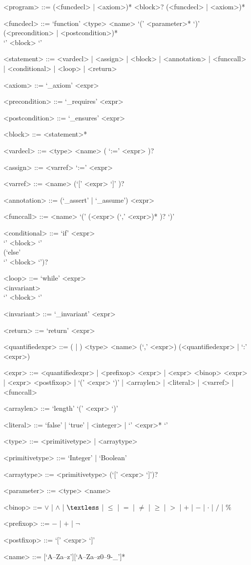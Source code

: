 \setlength{\grammarindent}{12em} %

\begin{grammar}

<program> ::= (<funcdecl> | <axiom>)* <block>? (<funcdecl> | <axiom>)*

<funcdecl> ::= `function' <type> <name> `(' <parameter>* `)' \\ (<precondition> | <postcondition>)* \\ `{' <block> `}'

<statement> ::= <vardecl> | <assign> | <block> | <annotation> | <funccall> | <conditional> | <loop> | <return>

<axiom> ::= `_axiom' <expr>

<precondition> ::= `_requires' <expr>

<postcondition> ::= `_ensures' <expr>

<block> ::= <statement>*

<vardecl> ::= <type> <name> ( `:=' <expr> )?

<assign> ::= <varref> `:=' <expr>

<varref> ::= <name> (`[' <expr> `]' )?

<annotation> ::= (`_assert' | `_assume') <expr>

<funccall> ::= <name> `(' (<expr> (`,' <expr>)* )? `)'

<conditional> ::= `if' <expr> \\ `{' <block> `}'  \\ (`else' \\ `{' <block> `}')?

<loop> ::= `while' <expr> \\ <invariant> \\ `{' <block> `}'

<invariant> ::= `_invariant' <expr>

<return> ::= `return' <expr>

<quantifiedexpr> ::= (\lit{$\forall$} | \lit{$\exists$} ) <type> <name> (`,' <expr>) (<quantifiedexpr> | `:' <expr>)

<expr> ::= <quantifiedexpr> | <prefixop> <expr> | <expr> <binop> <expr> | <expr> <postfixop> | `(' <expr> `)' | <arraylen> | <literal> | <varref> | <funccall>

<arraylen> ::= `length' `(' <expr> `)'

<literal> ::= `false' | `true' | <integer> | `{' <expr>* `}'

<type> ::= <primitivetype> | <arraytype>

<primitivetype> ::= `Integer' | `Boolean'

<arraytype> ::= <primitivetype> (`[' <expr> `]')?

<parameter> ::= <type> <name>

<binop> ::= $\vee$ | $\wedge$ | $\textless$ | $\leq$ | $=$ | $\neq$ | $\geq$ | $>$ | $+$ | $-$ | $\cdot$ | $/$ | $\%$

<prefixop> ::= $-$ | $+$ | $\neg$

<postfixop> ::= `[' <expr> `]'

<name> ::=  [`A--Za--z'][`A--Za--z0--9-\_']*

\end{grammar}


